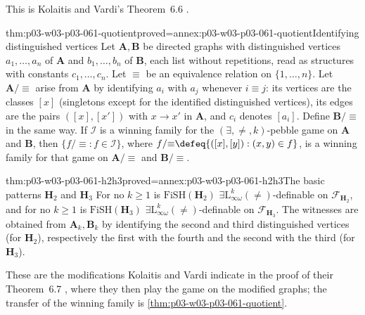 This is Kolaitis and Vardi's Theorem~6.6
\cite[Thm~6.6, p.~34]{KolaitisVardi1995DatalogManuscript}.

\begin{hblemma}{thm:p03-w03-p03-061-quotient}{proved=annex:p03-w03-p03-061-quotient}{Identifying distinguished vertices}
Let \(\mathbf A,\mathbf B\) be directed graphs with distinguished vertices
\(a_1,\ldots,a_n\) of \(\mathbf A\) and \(b_1,\ldots,b_n\) of \(\mathbf B\),
each list without repetitions, read as structures with constants
\(c_1,\ldots,c_n\). Let \(\equiv\) be an equivalence relation on
\(\{1,\ldots,n\}\). Let \(\mathbf A/{\equiv}\) arise from \(\mathbf A\) by
identifying \(a_i\) with \(a_j\) whenever \(i\equiv j\): its vertices are
the classes \([x]\) (singletons except for the identified distinguished
vertices), its edges are the pairs \(([x],[x'])\) with \(x\to x'\) in
\(\mathbf A\), and \(c_i\) denotes \([a_i]\). Define \(\mathbf B/{\equiv}\)
in the same way. If \(\mathcal I\) is a winning family for the
\((\exists,\neq,k)\)-pebble game on \(\mathbf A\) and \(\mathbf B\), then
\(\{f/{\equiv}:f\in\mathcal I\}\), where
\(f/{\equiv}\defeq\{([x],[y]):(x,y)\in f\}\), is a winning family for that
game on \(\mathbf A/{\equiv}\) and \(\mathbf B/{\equiv}\).
\end{hblemma}

\begin{hbtheorem}{thm:p03-w03-p03-061-h2h3}{proved=annex:p03-w03-p03-061-h2h3}{The basic patterns \(\mathbf H_2\) and \(\mathbf H_3\)}
For no \(k\ge1\) is \(\mathrm{FiSH}(\mathbf H_2)\)
\(\exists\mathrm L^k_{\infty\omega}(\neq)\)-definable on
\(\mathcal F_{\mathbf H_2}\), and for no \(k\ge1\) is
\(\mathrm{FiSH}(\mathbf H_3)\) \(\exists\mathrm L^k_{\infty\omega}(\neq)\)-definable
on \(\mathcal F_{\mathbf H_3}\). The witnesses are obtained from
\(\mathbf A_k,\mathbf B_k\) by identifying the second and third
distinguished vertices (for \(\mathbf H_2\)), respectively the first with the
fourth and the second with the third (for \(\mathbf H_3\)).
\end{hbtheorem}

These are the modifications Kolaitis and Vardi indicate in the proof of their
Theorem~6.7 \cite[Thm~6.7, pp.~38--39]{KolaitisVardi1995DatalogManuscript},
where they then play the game on the modified graphs; the transfer of the
winning family is \cref{thm:p03-w03-p03-061-quotient}.

